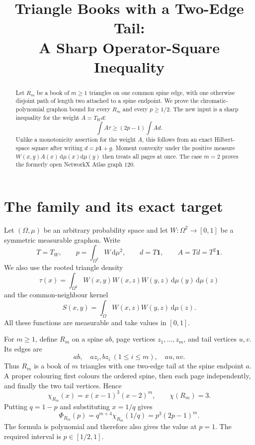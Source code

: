 \documentclass[11pt]{article}
\title{Triangle Books with a Two-Edge Tail:\\
A Sharp Operator-Square Inequality}
\author{}
\date{}
\newcommand{\dd}{\,\mathrm d}
\newcommand{\one}{\mathbf 1}
\begin{document}
\maketitle

\begin{abstract}
Let $R_m$ be a book of $m\geq1$ triangles on one common spine edge,
with one otherwise disjoint path of length two attached to a spine
endpoint.  We prove the chromatic-polynomial graphon bound for every
$R_m$ and every $p\geq1/2$.  The new input is a sharp inequality for the
weight $A=T_Wd$:
\[
 \int A\tau\geq(2p-1)\int Ad.
\]
Unlike a monotonicity assertion for the weight $A$, this follows from an
exact Hilbert-space square after writing $d=p\mathbf1+g$.  Moment convexity
under the positive measure $W(x,y)A(x)\,\mathrm d\mu(x)\mathrm d\mu(y)$
then treats all pages at once.  The case $m=2$ proves the formerly open
NetworkX Atlas graph $120$.
\end{abstract}


\section{The family and its exact target}

Let $(\Omega,\mu)$ be an arbitrary probability space and let
$W\colon\Omega^2\to[0,1]$ be a symmetric measurable graphon.  Write
\[
 T=T_W,\qquad
 p=\int_{\Omega^2}W\dd\mu^2,
 \qquad d=T\one,
 \qquad A=Td=T^2\one.
\]
We also use the rooted triangle density
\[
 \tau(x)=\int_{\Omega^2}
 W(x,y)W(x,z)W(y,z)\dd\mu(y)\dd\mu(z)
\]
and the common-neighbour kernel
\[
 S(x,y)=\int_\Omega W(x,z)W(y,z)\dd\mu(z).
\]
All these functions are measurable and take values in $[0,1]$.

For $m\geq1$, define $R_m$ on a spine $ab$, page vertices
$z_1,\ldots,z_m$, and tail vertices $u,v$.  Its edges are
\[
 ab,\quad az_i,bz_i\ (1\leq i\leq m),\quad au,uv.
\]
Thus $R_m$ is a book of $m$ triangles with one two-edge tail at the
spine endpoint $a$.  A proper colouring first colours the ordered spine,
then each page independently, and finally the two tail vertices.  Hence
\begin{equation}
 \chi_{R_m}(x)=x(x-1)^3(x-2)^m,
 \qquad \chi(R_m)=3.
 \label{eq:chromatic}
\end{equation}
Putting $q=1-p$ and substituting $x=1/q$ gives
\begin{equation}
 \Phi_{R_m}(p)
 =q^{m+4}\chi_{R_m}(1/q)
 =p^3(2p-1)^m.
 \label{eq:target}
\end{equation}
The formula is polynomial and therefore also gives the value at $p=1$.
The required interval is $p\in[1/2,1]$.
\end{document}
